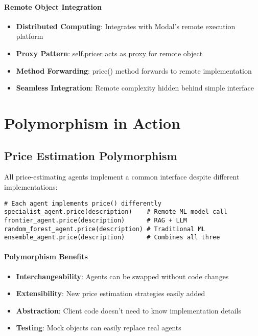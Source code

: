 \paragraph{Remote Object Integration}
\begin{itemize}
\item \textbf{Distributed Computing}: Integrates with Modal's remote execution platform
\item \textbf{Proxy Pattern}: self.pricer acts as proxy for remote object
\item \textbf{Method Forwarding}: price() method forwards to remote implementation
\item \textbf{Seamless Integration}: Remote complexity hidden behind simple interface
\end{itemize}

\section{Polymorphism in Action}

\subsection{Price Estimation Polymorphism}

All price-estimating agents implement a common interface despite different implementations:

\begin{lstlisting}[caption=Polymorphic Price Methods]
# Each agent implements price() differently
specialist_agent.price(description)    # Remote ML model call
frontier_agent.price(description)      # RAG + LLM
random_forest_agent.price(description) # Traditional ML
ensemble_agent.price(description)      # Combines all three
\end{lstlisting}

\paragraph{Polymorphism Benefits}
\begin{itemize}
\item \textbf{Interchangeability}: Agents can be swapped without code changes
\item \textbf{Extensibility}: New price estimation strategies easily added
\item \textbf{Abstraction}: Client code doesn't need to know implementation details
\item \textbf{Testing}: Mock objects can easily replace real agents
\end{itemize}

